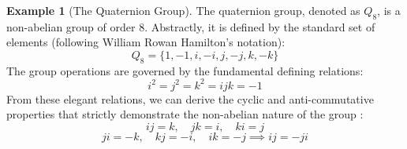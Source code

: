\documentclass[11pt]{article}
\theoremstyle{definition}
\newtheorem{example}{Example}[section]
\theoremstyle{plain}
\theoremstyle{remark}
\begin{document}
\begin{example}[The Quaternion Group]
The quaternion group, denoted as $Q_8$, is a non-abelian group of order 8. Abstractly, it is defined by the standard set of elements (following William Rowan Hamilton's notation):
\begin{equation}
    Q_8 = \{ 1, -1, i, -i, j, -j, k, -k \}
\end{equation}
The group operations are governed by the fundamental defining relations:
\begin{equation}
    i^2 = j^2 = k^2 = ijk = -1
\end{equation}
From these elegant relations, we can derive the cyclic and anti-commutative properties that strictly demonstrate the non-abelian nature of the group \cite{dummit}:
\begin{equation}
    ij = k, \quad jk = i, \quad ki = j
\end{equation}
\begin{equation}
    ji = -k, \quad kj = -i, \quad ik = -j \implies ij = -ji
\end{equation}


\end{example}
\end{document}
